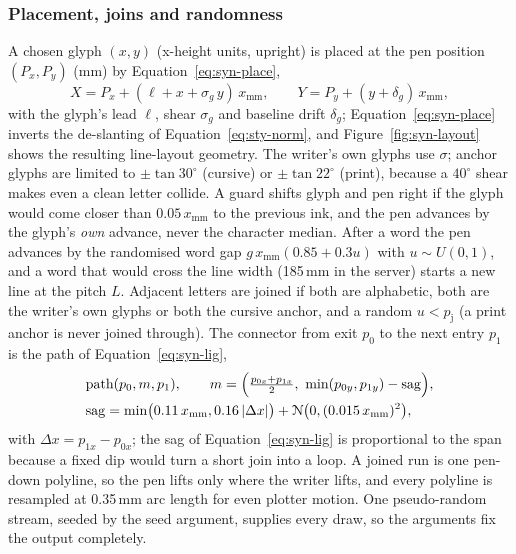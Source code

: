 \subsubsection{Placement, joins and randomness}

A chosen glyph $(x,y)$ (x-height units, upright) is placed at the pen position $(P_x,P_y)$ (mm) by Equation~\ref{eq:syn-place},
\begin{equation}
X=P_x+(\ell+x+\sigma_g\,y)\,x_{\mathrm{mm}},\qquad Y=P_y+(y+\delta_g)\,x_{\mathrm{mm}},
\label{eq:syn-place}
\end{equation}
with the glyph's lead $\ell$, shear $\sigma_g$ and baseline drift $\delta_g$; Equation~\ref{eq:syn-place} inverts the de-slanting of Equation~\ref{eq:sty-norm}, and Figure~\ref{fig:syn-layout} shows the resulting line-layout geometry.
The writer's own glyphs use $\sigma$; anchor glyphs are limited to $\pm\tan30^\circ$ (cursive) or $\pm\tan22^\circ$ (print), because a $40^\circ$ shear makes even a clean letter collide.
A guard shifts glyph and pen right if the glyph would come closer than $0.05\,x_{\mathrm{mm}}$ to the previous ink, and the pen advances by the glyph's \emph{own} advance, never the character median.
After a word the pen advances by the randomised word gap $g\,x_{\mathrm{mm}}(0.85+0.3u)$ with $u\sim U(0,1)$, and a word that would cross the line width (185\,mm in the server) starts a new line at the pitch $L$.
Adjacent letters are joined if both are alphabetic, both are the writer's own glyphs or both the cursive anchor, and a random $u<p_{\mathrm j}$ (a print anchor is never joined through).
The connector from exit $p_0$ to the next entry $p_1$ is the path of Equation~\ref{eq:syn-lig},
\begin{equation}
\begin{aligned}
&\text{path}(p_0,m,p_1),\qquad m=\Bigl(\tfrac{p_{0x}+p_{1x}}{2},\ \min(p_{0y},p_{1y})-\mathrm{sag}\Bigr),\\
&\mathrm{sag}=\min\bigl(0.11\,x_{\mathrm{mm}},0.16\,|\Delta x|\bigr)+\mathcal N\bigl(0,(0.015\,x_{\mathrm{mm}})^2\bigr),
\end{aligned}
\label{eq:syn-lig}
\end{equation}
with $\Delta x=p_{1x}-p_{0x}$; the sag of Equation~\ref{eq:syn-lig} is proportional to the span because a fixed dip would turn a short join into a loop.
A joined run is one pen-down polyline, so the pen lifts only where the writer lifts, and every polyline is resampled at 0.35\,mm arc length for even plotter motion.
One pseudo-random stream, seeded by the seed argument, supplies every draw, so the arguments fix the output completely.

